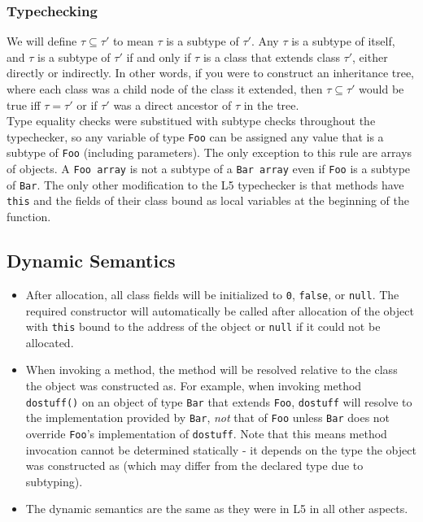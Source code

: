 \documentclass{article}
\begin{document}
\subsubsection{Typechecking}
We will define $\tau \subseteq \tau'$ to mean $\tau$ is a subtype of $\tau'$.
Any $\tau$ is a subtype of itself, and $\tau$ is a subtype of $\tau'$ if and only
if $\tau$ is a class that extends class $\tau'$, either directly or indirectly.
In other words, if you were to construct an inheritance tree, where each class
was a child node of the class it extended, then $\tau \subseteq \tau'$ would be
true iff $\tau = \tau'$ or if $\tau'$ was a direct ancestor of $\tau$ in the
tree. \\

Type equality checks were substitued with subtype checks throughout the
typechecker, so any variable of type \texttt{Foo} can be assigned any value that
is a subtype of \texttt{Foo} (including parameters). The only exception to this
rule are arrays of objects. A \texttt{Foo array} is not a subtype of a
\texttt{Bar array} even if \texttt{Foo} is a subtype of \texttt{Bar}. The only
other modification to the L5 typechecker is that methods have \texttt{this} and
the fields of their class bound as local variables at the beginning of the
function.

\subsection{Dynamic Semantics}
\begin{itemize}
\item After allocation, all class fields will be initialized to \texttt{0},
      \texttt{false}, or \texttt{null}. The required constructor will
      automatically be called after allocation of the object with \texttt{this}
      bound to the address of the object or \texttt{null} if it could not be
      allocated.
\item When invoking a method, the method will be resolved relative to the
      class the object was constructed as. For example, when invoking method
      \texttt{dostuff()} on an object of type \texttt{Bar} that extends 
      \texttt{Foo}, \texttt{dostuff} will resolve to the implementation provided
      by \texttt{Bar}, \emph{not} that of \texttt{Foo} unless \texttt{Bar} does
      not override \texttt{Foo}'s implementation of \texttt{dostuff}. Note that
      this means method invocation cannot be determined statically - it depends
      on the type the object was constructed as (which may differ from the
      declared type due to subtyping).
\item The dynamic semantics are the same as they were in L5 in all other aspects.
\end{itemize}
\end{document}
